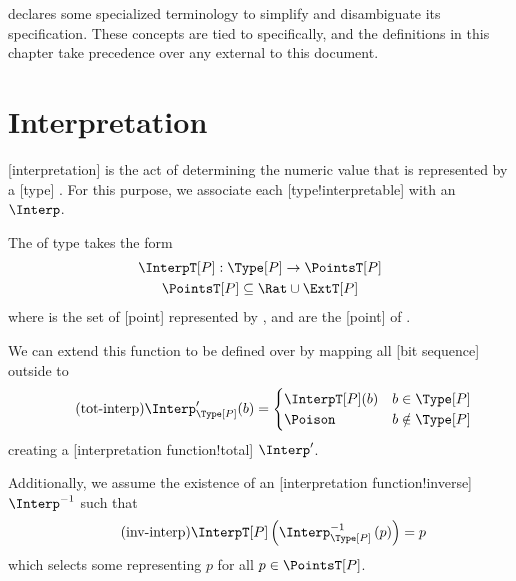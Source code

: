 \basetwo declares some specialized terminology to simplify and disambiguate its specification.
These concepts are tied to \basetwo specifically, and the definitions in this chapter take precedence over any external to this document.

\section{Interpretation}

[interpretation] is the act of determining the numeric value that is represented by a [type] .
For this purpose, we associate each [type!interpretable] with an  \(\Interp\).

\begin{definition}
    The  \InterpT[P] of type \Type[P] takes the form
    \begin{gather*}
        \InterpT[P] : \Type[P] \to \PointsT[P] \\
        \PointsT[P] \subseteq \Rat \cup \ExtT[P]
    \end{gather*}
    where \PointsT[P] is the set of [point] represented by \Type[P], and \ExtT[P] are the \impldef {}[point] of \Type[P].
\end{definition}

We can extend this function to be defined over \Buniv{} by mapping all [bit sequence] outside \Type[P] to \Poison
\begin{equation*}
    \label{eq:tot_interp}
    \tag{tot-interp}
    \Interp^{\prime}_{\Type[P]}(b) = \begin{cases}
        \InterpT[P](b) & b \in \Type[P] \\
        \Poison & b \notin \Type[P]
    \end{cases}
\end{equation*}
creating a [interpretation function!total] \(\Interp^{\prime}\).

Additionally, we assume the existence of an  [interpretation function!inverse] \(\Interp^{-1}\) such that
\begin{equation*}
    \label{eq:inv_interp}
    \tag{inv-interp}
    \InterpT[P]\left(\Interp^{-1}_{\Type[P]}\left(p\right)\right) = p
\end{equation*}
which selects some  representing \(p\) for all \(p \in \PointsT[P]\).

